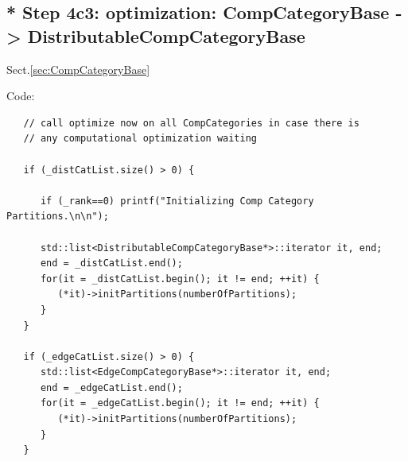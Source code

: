 \subsection{* Step 4c3: optimization: CompCategoryBase ->
DistributableCompCategoryBase}
\label{sec:GSL-simulations-part-optimize-CompCategories}

Sect.\ref{sec:CompCategoryBase}

Code:
\begin{verbatim}
   // call optimize now on all CompCategories in case there is                                                
   // any computational optimization waiting                                                                  
                                                                                                                                                                                                       
   if (_distCatList.size() > 0) {                                                                             
                                                                                                              
      if (_rank==0) printf("Initializing Comp Category Partitions.\n\n");                                     
                                                                                                              
      std::list<DistributableCompCategoryBase*>::iterator it, end;                                            
      end = _distCatList.end();                                                                               
      for(it = _distCatList.begin(); it != end; ++it) {                                                       
         (*it)->initPartitions(numberOfPartitions);                                                               
      }                                                                                                       
   }                                                                                                          
                                                                                                              
   if (_edgeCatList.size() > 0) {                                                                             
      std::list<EdgeCompCategoryBase*>::iterator it, end;                                                     
      end = _edgeCatList.end();                                                                               
      for(it = _edgeCatList.begin(); it != end; ++it) {                                                       
         (*it)->initPartitions(numberOfPartitions);                                                               
      }                                                                                                       
   }                                                                
\end{verbatim}

